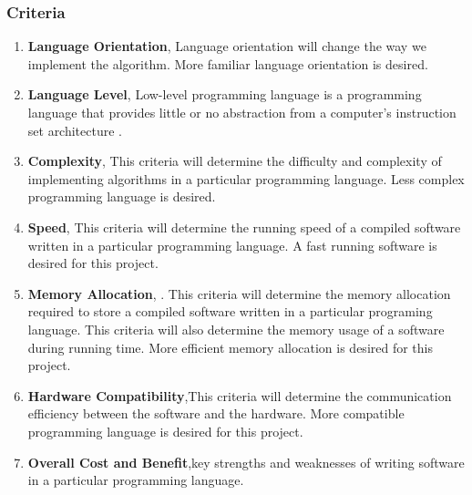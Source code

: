 \subsubsection{Criteria}
\begin{enumerate}
	\item \textbf{Language Orientation},  Language orientation will change the way we implement the algorithm. More familiar language orientation is desired. 
	\item \textbf{Language Level}, Low-level programming language is a programming language that provides little or no abstraction from a computer's instruction set architecture \cite{low}. 
	\item \textbf{Complexity}, This criteria will determine the difficulty and complexity of implementing algorithms in a particular programming language. Less complex programming language is desired.
	\item \textbf{Speed}, This criteria will determine the running speed of a compiled software written in a particular programming language. A fast running software is desired for this project. 
	\item \textbf{Memory Allocation}, . This criteria will determine the memory allocation required to store a compiled software written in a particular programing language. This criteria will also determine the memory usage of a software during running time. More efficient memory allocation is desired for this project. 
	\item \textbf{Hardware Compatibility},This criteria will determine the communication efficiency between the software and the hardware. More compatible programming language is desired for this project. 
	\item \textbf{Overall Cost and Benefit},key strengths and weaknesses of writing software in a particular programming language.\\
\end{enumerate}

